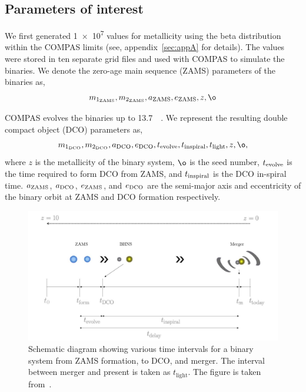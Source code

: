 
\subsection{Parameters of interest}
We first generated \num{1e7} values for metallicity using the beta distribution within the COMPAS limits (see, appendix~\ref{sec:appA} for details).
The values were stored in ten separate grid files and used with COMPAS to simulate the binaries.
We denote the zero-age main sequence (ZAMS) parameters of the binaries as,
\begin{equation}%
    \mone{ZAMS}, \mtwo{ZAMS}, \semaxis{ZAMS}, \ecc{ZAMS}, z, \o
\end{equation}%

COMPAS evolves the binaries up to \SI{13.7}{\giga\yr}.
We represent the resulting double compact object (DCO) parameters as,
\begin{equation}%
    \mone{DCO}, \mtwo{DCO}, \semaxis{DCO}, \ecc{DCO}, \interval{evolve}, \interval{inspiral}, \interval{light}, z, \o,
\end{equation}%
where $z$ is the metallicity of the binary system, $\o$ is the seed number, $t_\text{evolve}$ is the time required to form DCO from ZAMS, and $t_\text{inspiral}$ is the DCO in-spiral time. $a_{\text{ZAMS}}$, $a_{\text{DCO}}$, $e_\text{ZAMS}$, and $e_\text{DCO}$ are the semi-major axis and eccentricity of the binary orbit at ZAMS and DCO formation respectively.
\begin{figure}[!ht]%
    \centering
    \includegraphics[width=\linewidth]{images/binary_evolution}
    \caption{Schematic diagram showing various time intervals for a binary system from ZAMS formation, to DCO, and merger. The interval between merger and present is taken as $t_\text{light}$. The figure is taken from~\cite{Riley2022}.}
    \label{fig:binaryevolution}
\end{figure}%

